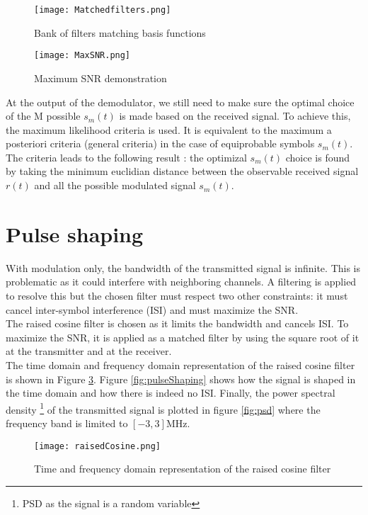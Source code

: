  \begin{figure}[H]
    \centering
    \texttt{[image: Matchedfilters.png]}
    \caption{Bank of filters matching basis functions}
    \label{fig:Matchedfilters}
\end{figure}

\begin{figure}[H]
    \centering
    \texttt{[image: MaxSNR.png]}
    \caption{Maximum SNR demonstration}
    \label{fig:MaxSNR}
\end{figure}

At the output of the demodulator, we still need to make sure the optimal choice of the M possible $s_m(t)$ is made based on the received signal.
To achieve this, the maximum likelihood criteria is used. It is equivalent to the maximum a posteriori criteria (general criteria) in the case of equiprobable symbols $s_m(t)$.
The criteria leads to the following result : the optimizal $s_m(t)$ choice is found by taking the minimum euclidian distance between the observable received signal $r(t)$ 
and all the possible modulated signal $s_m(t)$.

\section{Pulse shaping}

With modulation only, the bandwidth of the transmitted signal is infinite. This is problematic as it could interfere with neighboring channels. A filtering is applied to resolve this but the chosen filter must respect two other constraints: it must cancel inter-symbol interference (ISI) and must maximize the SNR. \\
The raised cosine filter is chosen as it limits the bandwidth and cancels ISI. To maximize the SNR, it is applied as a matched filter by using the square root of it at the transmitter and at the receiver. \\
The time domain and frequency domain representation of the raised cosine filter is shown in Figure \ref{fig:raisedCosine}. Figure \ref{fig:pulseShaping} shows how the signal is shaped in the time domain and how there is indeed no ISI. Finally, the power spectral density \footnote{PSD as the signal is a random variable} of the transmitted signal is plotted in figure \ref{fig:psd} where the frequency band is limited to $[-3, 3]$MHz. \\

\begin{figure}[H]
    \centering
    \texttt{[image: raisedCosine.png]}
    \caption{Time and frequency domain representation of the raised cosine filter}
    \label{fig:raisedCosine}
\end{figure}

